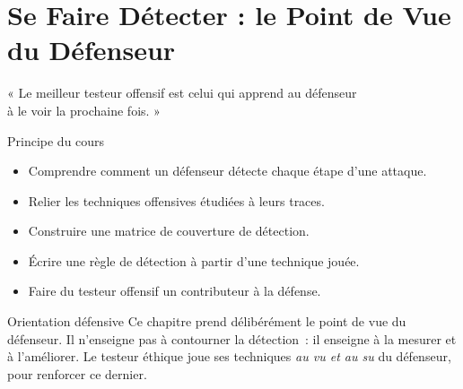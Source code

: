
\chapter{Se Faire Détecter : le Point de Vue du Défenseur}
\label{chap:detection}

\epigraph{%
    « Le meilleur testeur offensif est celui qui apprend au défenseur\\
    à le voir la prochaine fois. »%
}{Principe du cours}


\begin{boxobjectifs}
\begin{itemize}
    \item Comprendre comment un défenseur détecte chaque étape d'une
          attaque.
    \item Relier les techniques offensives étudiées à leurs traces.
    \item Construire une matrice de couverture de détection.
    \item Écrire une règle de détection à partir d'une technique jouée.
    \item Faire du testeur offensif un contributeur à la défense.
\end{itemize}
\end{boxobjectifs}

\bigskip

\begin{boiteRemarque}{Orientation défensive}
Ce chapitre prend délibérément le point de vue du défenseur. Il n'enseigne
pas à contourner la détection~: il enseigne à la mesurer et à l'améliorer.
Le testeur éthique joue ses techniques \emph{au vu et au su} du défenseur,
pour renforcer ce dernier.
\end{boiteRemarque}

